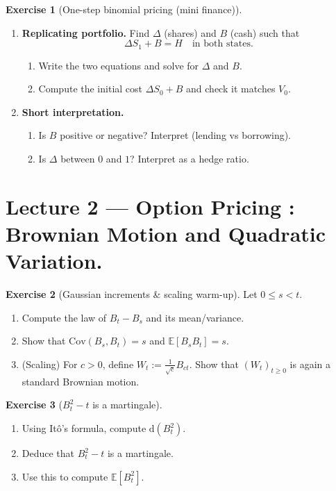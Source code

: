 \documentclass[11pt]{article}
\newcommand{\E}{\mathbb{E}}
\newcommand{\1}{\mathbf{1}}
\theoremstyle{definition}
\newtheorem{exercise}{Exercise}[section]
\begin{document}
\begin{exercise}[One-step binomial pricing (mini finance)]
\begin{enumerate}[label=\textbf{(\alph*)}, itemsep=0.35em]
  \item \textbf{Replicating portfolio.}
  Find $\Delta$ (shares) and $B$ (cash) such that
  $$
  \Delta S_1 + B = H
  \quad\text{in both states.}
  $$
  \begin{enumerate}[label=\textbf{(\roman*)}, itemsep=0.2em]
    \item Write the two equations and solve for $\Delta$ and $B$.
    \item Compute the initial cost $\Delta S_0 + B$ and check it matches $V_0$.
  \end{enumerate}

  \item \textbf{Short interpretation.}
  \begin{enumerate}[label=\textbf{(\roman*)}, itemsep=0.2em]
    \item Is $B$ positive or negative? Interpret (lending vs borrowing).
    \item Is $\Delta$ between $0$ and $1$? Interpret as a hedge ratio.
  \end{enumerate}

\end{enumerate}
\end{exercise}



\section{Lecture 2 --- Option Pricing : Brownian Motion and Quadratic Variation.}

\begin{exercise}[Gaussian increments \& scaling warm-up]
Let $0\le s<t$.
\begin{enumerate}
\item Compute the law of $B_t-B_s$ and its mean/variance.
\item Show that $\mathrm{Cov}(B_s,B_t)=s$ and $\E[B_sB_t]=s$.
\item (Scaling) For $c>0$, define $W_t:=\frac{1}{\sqrt c}B_{ct}$.
Show that $(W_t)_{t\ge 0}$ is again a standard Brownian motion.
\end{enumerate}
\end{exercise}

\begin{exercise}[$B_t^2-t$ is a martingale]
\begin{enumerate}
\item Using It\^o's formula, compute $\mathrm{d}(B_t^2)$.
\item Deduce that $B_t^2-t$ is a martingale.
\item Use this to compute $\E[B_t^2]$.
\end{enumerate}
\end{exercise}
\end{document}
